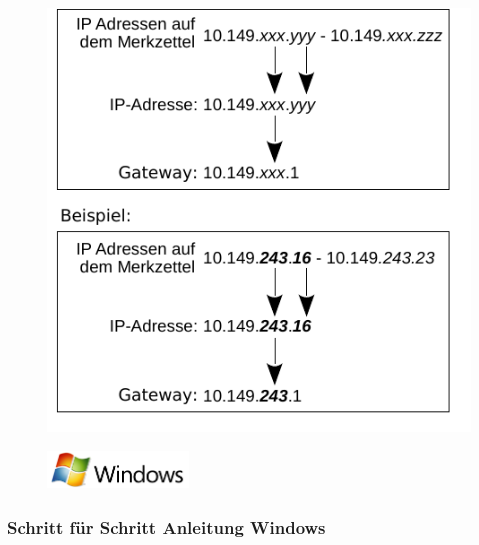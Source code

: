 \documentclass[a4paper,12pt]{scrartcl}
\begin{document}
\begin{figure}[h!]
		\centering
		\begin{minipage}[c]{0.45\linewidth}
			\centering
			\includegraphics[width=\linewidth,keepaspectratio]{Bilder/IP_Gerneric_mb}
		\end{minipage}
	\end{figure}

\newpage
\enlargethispage{20pt}


\begin{figure}[h]
	\raggedleft
	\vspace{-20pt}
	\includegraphics[height=1cm,keepaspectratio]{Bilder/Windows_logo}
	\vspace{-30pt}
\end{figure}

\subsubsection*{Schritt für Schritt Anleitung Windows}
\end{document}
